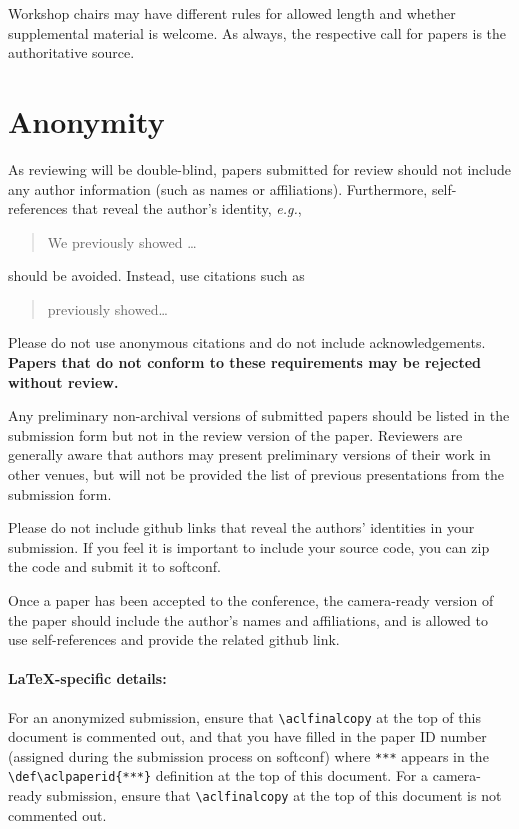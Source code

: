\documentclass[11pt,a4paper]{article}
\begin{document}
	Workshop chairs may have different rules for allowed length and whether supplemental material is welcome.
	As always, the respective call for papers is the authoritative source.
	
	
	\section{Anonymity}
	As reviewing will be double-blind, papers submitted for review should not include any author information (such as names or affiliations). Furthermore, self-references that reveal the author's identity, \emph{e.g.},
	\begin{quote}
		We previously showed \citep{Gusfield:97} \ldots
	\end{quote}
	should be avoided. Instead, use citations such as 
	\begin{quote}
		\citet{Gusfield:97} previously showed\ldots
	\end{quote}
	Please do not use anonymous citations and do not include acknowledgements.
	\textbf{Papers that do not conform to these requirements may be rejected without review.}
	
	Any preliminary non-archival versions of submitted papers should be listed in the submission form but not in the review version of the paper.
	Reviewers are generally aware that authors may present preliminary versions of their work in other venues, but will not be provided the list of previous presentations from the submission form. 
	
	Please do not include github links that reveal the authors' identities in your submission. If you feel it is important to include your source code, you can zip the code and submit it to softconf. 
	
	Once a paper has been accepted to the conference, the camera-ready version of the paper should include the author's names and affiliations, and is allowed to use self-references and provide the related github link.
	
	
	\paragraph{\LaTeX-specific details:}
	For an anonymized submission, ensure that {\small\verb|\aclfinalcopy|} at the top of this document is commented out, and that you have filled in the paper ID number (assigned during the submission process on softconf) where {\small\verb|***|} appears in the {\small\verb|\def\aclpaperid{***}|} definition at the top of this document.
	For a camera-ready submission, ensure that {\small\verb|\aclfinalcopy|} at the top of this document is not commented out.
	
\end{document}
